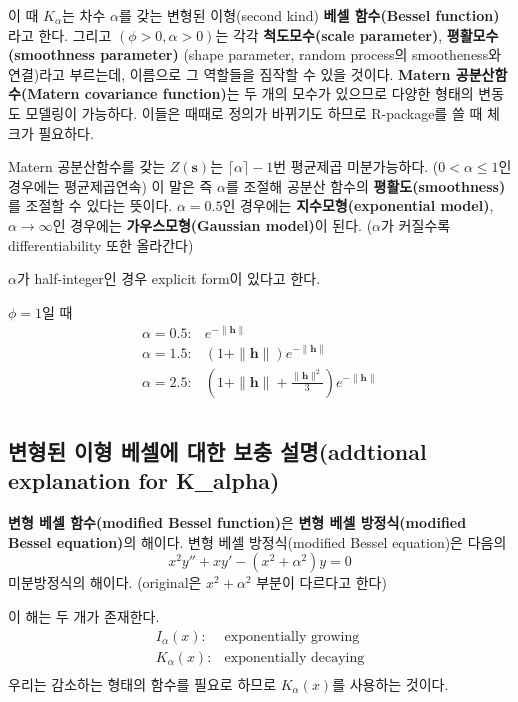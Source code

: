 \documentclass[b5paper,]{scrbook}
\theoremstyle{plain}
\theoremstyle{definition}
\numberwithin{equation}{section}
\let\BeginKnitrBlock\begin \let\EndKnitrBlock\end
\begin{document}
이 때 \(K_{\alpha}\)는 차수 \(\alpha\)를 갖는 변형된 이형(second kind) \textbf{베셀 함수(Bessel function)}라고 한다. 그리고 \((\phi>0,\alpha>0)\)는 각각 \textbf{척도모수(scale parameter)}, \textbf{평활모수(smoothness parameter)} (shape parameter, random process의 smootheness와 연결)라고 부르는데, 이름으로 그 역할들을 짐작할 수 있을 것이다. \textbf{Matern 공분산함수(Matern covariance function)}는 두 개의 모수가 있으므로 다양한 형태의 변동도 모델링이 가능하다. 이들은 때때로 정의가 바뀌기도 하므로 R-package를 쓸 때 체크가 필요하다.

Matern 공분산함수를 갖는 \(Z(\mathbf{s})\)는 \(\lceil \alpha \rceil -1\)번 평균제곱 미분가능하다. (\(0<\alpha \leq 1\)인 경우에는 평균제곱연속) 이 말은 즉 \(\alpha\)를 조절해 공분산 함수의 \textbf{평활도(smoothness)}를 조절할 수 있다는 뜻이다. \(\alpha=0.5\)인 경우에는 \textbf{지수모형(exponential model)}, \(\alpha \rightarrow \infty\)인 경우에는 \textbf{가우스모형(Gaussian model)}이 된다. (\(\alpha\)가 커질수록 differentiability 또한 올라간다)

\(\alpha\)가 half-integer인 경우 explicit form이 있다고 한다.

\BeginKnitrBlock{example}[Matern 공분산 함수의 예.]
\protect\hypertarget{exm:unnamed-chunk-372}{}{\label{exm:unnamed-chunk-372} {} }\(\phi=1\)일 때
\[
\begin{array}{ll}
\alpha=0.5: & e^{-\|\mathbf{h}\|}\\
\alpha=1.5: & (1+\|\mathbf{h}\|)e^{-\|\mathbf{h}\|}\\
\alpha=2.5: & (1+\|\mathbf{h}\| + \frac{\|\mathbf{h}\|^{2}}{3})e^{-\|\mathbf{h}\|}\\
\end{array}
\]
\EndKnitrBlock{example}

\hypertarget{-----addtional-explanation-for-k_alpha}{%
\subsection{변형된 이형 베셀에 대한 보충 설명(addtional explanation for K\_alpha)}\label{-----addtional-explanation-for-k_alpha}}

\textbf{변형 베셀 함수(modified Bessel function)}은 \textbf{변형 베셀 방정식(modified Bessel equation)}의 해이다. 변형 베셀 방정식(modified Bessel equation)은 다음의
\[x^{2}y''+xy'-(x^{2}+\alpha^{2})y=0\]
미분방정식의 해이다. (original은 \(x^{2}+\alpha^{2}\) 부분이 다르다고 한다)

이 해는 두 개가 존재한다.
\[
\begin{array}{ll}
I_{\alpha}(x): & \text{exponentially growing}\\
K_{\alpha}(x): & \text{exponentially decaying}\\
\end{array}
\]
우리는 감소하는 형태의 함수를 필요로 하므로 \(K_{\alpha}(x)\)를 사용하는 것이다.
\end{document}
